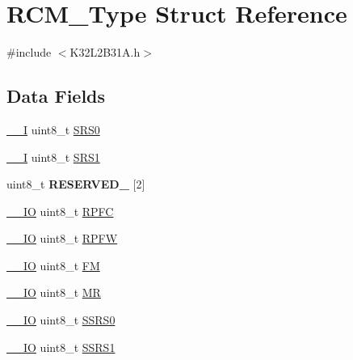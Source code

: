 \hypertarget{struct_r_c_m___type}{}\section{R\+C\+M\+\_\+\+Type Struct Reference}
\label{struct_r_c_m___type}


{\ttfamily \#include $<$K32\+L2\+B31\+A.\+h$>$}

\subsection*{Data Fields}
\begin{DoxyCompactItemize}
\item 
\mbox{\hyperlink{core__cm0plus_8h_af63697ed9952cc71e1225efe205f6cd3}{\+\_\+\+\_\+I}} uint8\+\_\+t \mbox{\hyperlink{struct_r_c_m___type_a41d4e6ae9fb47445146929d15e97153f}{S\+R\+S0}}
\item 
\mbox{\hyperlink{core__cm0plus_8h_af63697ed9952cc71e1225efe205f6cd3}{\+\_\+\+\_\+I}} uint8\+\_\+t \mbox{\hyperlink{struct_r_c_m___type_a2164524ec77565baad264a25fbc65378}{S\+R\+S1}}
\item 
\mbox{\label{struct_r_c_m___type_a1d386ff4b328960f430b4c63f61423fa}} 
uint8\+\_\+t {\bfseries R\+E\+S\+E\+R\+V\+E\+D\+\_} \mbox{[}2\mbox{]}
\item 
\mbox{\hyperlink{core__cm0plus_8h_aec43007d9998a0a0e01faede4133d6be}{\+\_\+\+\_\+\+IO}} uint8\+\_\+t \mbox{\hyperlink{struct_r_c_m___type_adb3a6cb8a3c37e9a55ab12962d0983d1}{R\+P\+FC}}
\item 
\mbox{\hyperlink{core__cm0plus_8h_aec43007d9998a0a0e01faede4133d6be}{\+\_\+\+\_\+\+IO}} uint8\+\_\+t \mbox{\hyperlink{struct_r_c_m___type_a9423324babed28ac7e0a6990356c8cb1}{R\+P\+FW}}
\item 
\mbox{\hyperlink{core__cm0plus_8h_aec43007d9998a0a0e01faede4133d6be}{\+\_\+\+\_\+\+IO}} uint8\+\_\+t \mbox{\hyperlink{struct_r_c_m___type_a9dc688d824bd4fbad7ae0cbf014ab941}{FM}}
\item 
\mbox{\hyperlink{core__cm0plus_8h_aec43007d9998a0a0e01faede4133d6be}{\+\_\+\+\_\+\+IO}} uint8\+\_\+t \mbox{\hyperlink{struct_r_c_m___type_a91433e592a086af139d7860f6a37b723}{MR}}
\item 
\mbox{\hyperlink{core__cm0plus_8h_aec43007d9998a0a0e01faede4133d6be}{\+\_\+\+\_\+\+IO}} uint8\+\_\+t \mbox{\hyperlink{struct_r_c_m___type_a15733121a3927d30210bdcdf90f2d296}{S\+S\+R\+S0}}
\item 
\mbox{\hyperlink{core__cm0plus_8h_aec43007d9998a0a0e01faede4133d6be}{\+\_\+\+\_\+\+IO}} uint8\+\_\+t \mbox{\hyperlink{struct_r_c_m___type_a7b2815c39ff2f860d979b2aa9f18d773}{S\+S\+R\+S1}}
\end{DoxyCompactItemize}


